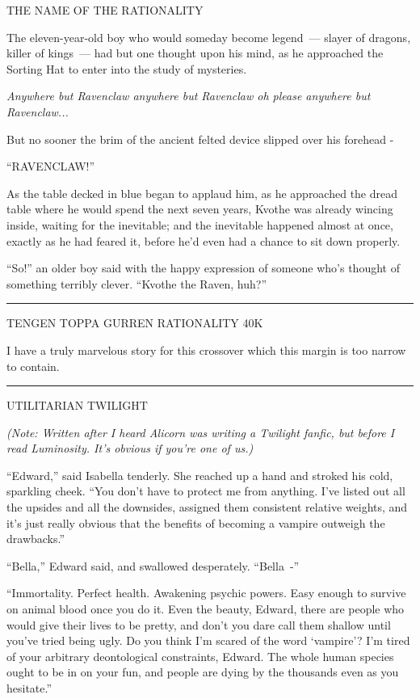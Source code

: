 THE NAME OF THE RATIONALITY

The eleven-year-old boy who would someday become legend~--- slayer of dragons, killer of kings~--- had but one thought upon his mind, as he approached the Sorting Hat to enter into the study of mysteries.

\emph{Anywhere but Ravenclaw anywhere but Ravenclaw oh please anywhere but Ravenclaw...}

But no sooner the brim of the ancient felted device slipped over his forehead -

``RAVENCLAW!''

As the table decked in blue began to applaud him, as he approached the dread table where he would spend the next seven years, Kvothe was already wincing inside, waiting for the inevitable; and the inevitable happened almost at once, exactly as he had feared it, before he'd even had a chance to sit down properly.

``So!'' an older boy said with the happy expression of someone who's thought of something terribly clever. ``Kvothe the Raven, huh?''

\begin{center}\rule{3in}{0.4pt}\end{center}

TENGEN TOPPA GURREN RATIONALITY 40K

I have a truly marvelous story for this crossover which this margin is too narrow to contain.

\begin{center}\rule{3in}{0.4pt}\end{center}

UTILITARIAN TWILIGHT

\emph{(Note: Written after I heard Alicorn was writing a Twilight fanfic, but before I read Luminosity. It's obvious if you're one of us.)}

``Edward,'' said Isabella tenderly. She reached up a hand and stroked his cold, sparkling cheek. ``You don't have to protect me from anything. I've listed out all the upsides and all the downsides, assigned them consistent relative weights, and it's just really obvious that the benefits of becoming a vampire outweigh the drawbacks.''

``Bella,'' Edward said, and swallowed desperately. ``Bella~-''

``Immortality. Perfect health. Awakening psychic powers. Easy enough to survive on animal blood once you do it. Even the beauty, Edward, there are people who would give their lives to be pretty, and don't you dare call them shallow until you've tried being ugly. Do you think I'm scared of the word `vampire'? I'm tired of your arbitrary deontological constraints, Edward. The whole human species ought to be in on your fun, and people are dying by the thousands even as you hesitate.''

